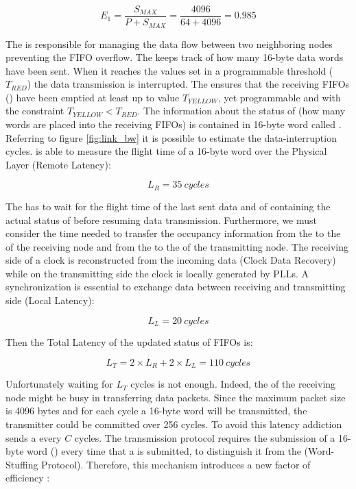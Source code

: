 $$E_{1}=\frac{S_{MAX}}{P+S_{MAX}}=\frac{4096}{64+4096}=0.985$$


The  is responsible for managing the data flow between
two neighboring nodes preventing the FIFO overflow. The 
keeps track of how many 16-byte data words have been sent. When it
reaches the values set in a programmable threshold ($T_{RED}$) the
data transmission is interrupted.
The  ensures that the receiving FIFOs ()
have been emptied at least up to value $T_{YELLOW}$, yet programmable
and with the constraint $T_{YELLOW} < T_{RED}$.
The information about the status of  (how many words
are placed into the receiving FIFOs) is contained in 16-byte word
called \credit.
Referring to figure \ref{fig:link_bw} it is possible to estimate the
data-interruption cycles.  is able to measure the flight
time of a 16-byte word over the Physical Layer (Remote Latency):

$$L_{R}=35\ cycles$$   


The  has to wait for the flight time of the last sent
data and of \credit containing the actual status of 
before resuming data transmission.
Furthermore, we must consider the time needed to transfer the
occupancy information from the  to the 
of the receiving node and from the  to the  of
the transmitting node. The receiving side of a  clock is
reconstructed from the incoming data (Clock Data Recovery) while on
the transmitting side the clock is locally generated by PLLs. A
synchronization is essential to exchange data between receiving and
transmitting side (Local Latency):

$$L_{L}=20\ cycles$$   


Then the Total Latency of the updated status of FIFOs is:

$$L_{T}=2 \times L_{R}+2 \times L_{L}=110\ cycles$$ 


Unfortunately waiting for $L_{T}$ cycles is not enough. Indeed, the
 of the receiving node might be busy in transferring data
packets. Since the maximum packet size is 4096 bytes and for each
cycle a 16-byte word will be transmitted, the transmitter could be
committed over 256 cycles. To avoid this latency addiction  sends a \credit every $C$ cycles.
The transmission protocol requires the submission of a 16-byte word
(\magic) every time that a \credit is submitted, to distinguish it
from the \payload (Word-Stuffing Protocol). Therefore, this mechanism
introduces a new factor of efficiency :

